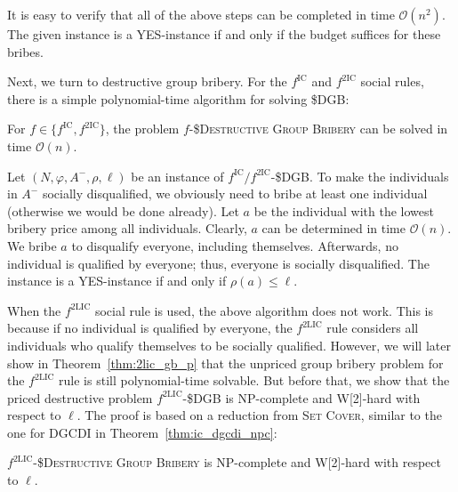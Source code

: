 \documentclass[
    12pt,               %
    a4paper,            %
    bibtotoc,           %
    pointlessnumbers,   %
    ngerman,            %
    titlepage,          %
    leqno,              %
    ]{scrarticle}       %
\newcommand\thmref{Theorem~\ref}
\begin{document}
\begin{Proof}
It is easy to verify that all of the above steps can be completed in time $\mathcal{O}(n^2)$. The given instance is a YES-instance if and only if the budget suffices for these bribes.
\end{Proof}



Next, we turn to destructive group bribery. For the $f^{\text{IC}}$ and $f^{\text{2IC}}$ social rules, there is a simple polynomial-time algorithm for solving \$DGB:

\begin{Theorem} \label{thm:2ic_dgb_p}
For $f \in \{ f^{\text{IC}}, f^{\text{2IC}} \}$, the problem $f$-\textsc{\$Destructive Group Bribery} can be solved in time $\mathcal{O}(n)$.
\end{Theorem}

\begin{Proof}
Let $(N, \varphi, A^-, \rho, \ell)$ be an instance of $f^{\text{IC}} / f^{\text{2IC}}$-\$DGB. To make the individuals in $A^-$ socially disqualified, we obviously need to bribe at least one individual (otherwise we would be done already). Let $a$ be the individual with the lowest bribery price among all individuals. Clearly, $a$ can be determined in time $\mathcal{O}(n)$. We bribe $a$ to disqualify everyone, including themselves. Afterwards, no individual is qualified by everyone; thus, everyone is socially disqualified. The instance is a YES-instance if and only if $\rho(a) \leq \ell$.
\end{Proof}



When the $f^{\text{2LIC}}$ social rule is used, the above algorithm does not work. This is because if no individual is qualified by everyone, the $f^{\text{2LIC}}$ rule considers all individuals who qualify themselves to be socially qualified. However, we will later show in \thmref{thm:2lic_gb_p} that the unpriced group bribery problem for the $f^{\text{2LIC}}$ rule is still polynomial-time solvable. But before that, we show that the priced destructive problem $f^{\text{2LIC}}$-\$DGB is NP-complete and W[2]-hard with respect to $\ell$. The proof is based on a reduction from \textsc{Set Cover}, similar to the one for DGCDI in \thmref{thm:ic_dgcdi_npc}:

\begin{Theorem} \label{thm:2lic_dgb_npc}
$f^{\text{2LIC}}$-\textsc{\$Destructive Group Bribery} is NP-complete and W[2]-hard with respect to $\ell$.
\end{Theorem}
\end{document}

